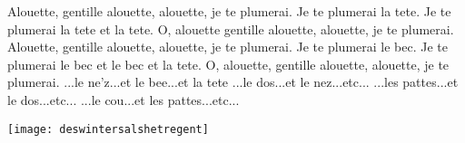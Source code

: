\beginverse
Alouette, gentille alouette, alouette, je te plumerai.
Je te plumerai la tete. 
Je te plumerai la tete et la tete.
O, alouette gentille alouette, alouette, je te plumerai.
\endverse
\beginverse
Alouette, gentille alouette, alouette, je te plumerai.
Je te plumerai le bec.
Je te plumerai le bec et le bec et la tete.
O, alouette, gentille alouette, alouette, je te plumerai.
\endverse
\beginverse
...le ne'z...et le bee...et la tete
\endverse
\beginverse
...le dos...et le nez...etc...
\endverse
\beginverse
...les pattes...et le dos...etc...
\endverse
\beginverse
 ...le cou...et les pattes...etc...
\endverse
\endsong
\begin{intersong}
    \texttt{[image: deswintersalshetregent]}
\end{intersong}